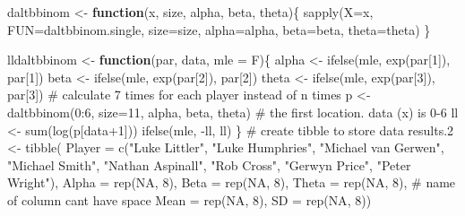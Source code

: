\documentclass[
]{article}
\newenvironment{Shaded}{\begin{snugshade}}{\end{snugshade}}
\newcommand{\AttributeTok}[1]{\textcolor[rgb]{0.40,0.45,0.13}{#1}}
\newcommand{\CommentTok}[1]{\textcolor[rgb]{0.37,0.37,0.37}{#1}}
\newcommand{\ConstantTok}[1]{\textcolor[rgb]{0.56,0.35,0.01}{#1}}
\newcommand{\ControlFlowTok}[1]{\textcolor[rgb]{0.00,0.23,0.31}{\textbf{#1}}}
\newcommand{\DecValTok}[1]{\textcolor[rgb]{0.68,0.00,0.00}{#1}}
\newcommand{\FloatTok}[1]{\textcolor[rgb]{0.68,0.00,0.00}{#1}}
\newcommand{\FunctionTok}[1]{\textcolor[rgb]{0.28,0.35,0.67}{#1}}
\newcommand{\NormalTok}[1]{\textcolor[rgb]{0.00,0.23,0.31}{#1}}
\newcommand{\OtherTok}[1]{\textcolor[rgb]{0.00,0.23,0.31}{#1}}
\newcommand{\SpecialCharTok}[1]{\textcolor[rgb]{0.37,0.37,0.37}{#1}}
\newcommand{\StringTok}[1]{\textcolor[rgb]{0.13,0.47,0.30}{#1}}
\begin{document}
\begin{Shaded}
\begin{Highlighting}[numbers=left,,]
\NormalTok{daltbbinom }\OtherTok{\textless{}{-}} \ControlFlowTok{function}\NormalTok{(x, size, alpha, beta, theta)\{}
  \FunctionTok{sapply}\NormalTok{(}\AttributeTok{X=}\NormalTok{x, }\AttributeTok{FUN=}\NormalTok{daltbbinom.single, }\AttributeTok{size=}\NormalTok{size, }\AttributeTok{alpha=}\NormalTok{alpha, }\AttributeTok{beta=}\NormalTok{beta, }\AttributeTok{theta=}\NormalTok{theta)}
\NormalTok{\}}

\NormalTok{lldaltbbinom }\OtherTok{\textless{}{-}} \ControlFlowTok{function}\NormalTok{(par, data, }\AttributeTok{mle =}\NormalTok{ F)\{}
\NormalTok{  alpha  }\OtherTok{\textless{}{-}} \FunctionTok{ifelse}\NormalTok{(mle, }\FunctionTok{exp}\NormalTok{(par[}\DecValTok{1}\NormalTok{]), par[}\DecValTok{1}\NormalTok{])}
\NormalTok{  beta }\OtherTok{\textless{}{-}} \FunctionTok{ifelse}\NormalTok{(mle, }\FunctionTok{exp}\NormalTok{(par[}\DecValTok{2}\NormalTok{]), par[}\DecValTok{2}\NormalTok{])}
\NormalTok{  theta }\OtherTok{\textless{}{-}} \FunctionTok{ifelse}\NormalTok{(mle, }\FunctionTok{exp}\NormalTok{(par[}\DecValTok{3}\NormalTok{]), par[}\DecValTok{3}\NormalTok{])}
  \CommentTok{\# calculate 7 times for each player instead of n times}
\NormalTok{  p }\OtherTok{\textless{}{-}} \FunctionTok{daltbbinom}\NormalTok{(}\DecValTok{0}\SpecialCharTok{:}\DecValTok{6}\NormalTok{, }\AttributeTok{size=}\DecValTok{11}\NormalTok{, alpha, beta, theta)}
  \CommentTok{\# the first location. data (x) is 0{-}6}
\NormalTok{  ll }\OtherTok{\textless{}{-}} \FunctionTok{sum}\NormalTok{(}\FunctionTok{log}\NormalTok{(p[data}\SpecialCharTok{+}\DecValTok{1}\NormalTok{]))}
  \FunctionTok{ifelse}\NormalTok{(mle, }\SpecialCharTok{{-}}\NormalTok{ll, ll)}
\NormalTok{\}}
\CommentTok{\# create tibble to store data}
\NormalTok{results}\FloatTok{.2} \OtherTok{\textless{}{-}} \FunctionTok{tibble}\NormalTok{(}
  \AttributeTok{Player =} \FunctionTok{c}\NormalTok{(}\StringTok{"Luke Littler"}\NormalTok{, }\StringTok{"Luke Humphries"}\NormalTok{, }\StringTok{"Michael van Gerwen"}\NormalTok{, }\StringTok{"Michael Smith"}\NormalTok{, }
             \StringTok{"Nathan Aspinall"}\NormalTok{, }\StringTok{"Rob Cross"}\NormalTok{, }\StringTok{"Gerwyn Price"}\NormalTok{, }\StringTok{"Peter Wright"}\NormalTok{),}
  \AttributeTok{Alpha =} \FunctionTok{rep}\NormalTok{(}\ConstantTok{NA}\NormalTok{, }\DecValTok{8}\NormalTok{),}
  \AttributeTok{Beta =} \FunctionTok{rep}\NormalTok{(}\ConstantTok{NA}\NormalTok{, }\DecValTok{8}\NormalTok{),}
  \AttributeTok{Theta =} \FunctionTok{rep}\NormalTok{(}\ConstantTok{NA}\NormalTok{, }\DecValTok{8}\NormalTok{),}
  \CommentTok{\# name of column can\textquotesingle{}t have space}
  \AttributeTok{Mean =} \FunctionTok{rep}\NormalTok{(}\ConstantTok{NA}\NormalTok{, }\DecValTok{8}\NormalTok{),}
  \AttributeTok{SD =} \FunctionTok{rep}\NormalTok{(}\ConstantTok{NA}\NormalTok{, }\DecValTok{8}\NormalTok{))}
\end{Highlighting}
\end{Shaded}
\end{document}
